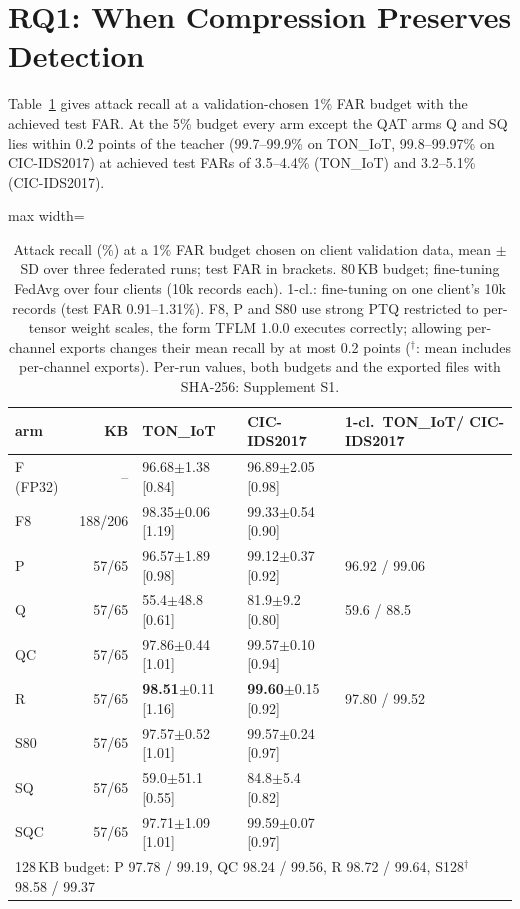 \documentclass[sigplan,10pt,review,anonymous,nonacm]{acmart}
\newcommand{\cic}{CIC-IDS2017\xspace}
\newcommand{\ton}{TON\_IoT\xspace}
\begin{document}
\section{RQ1: When Compression Preserves Detection}\label{sec:rq1}
Table~\ref{tab:e1} gives attack recall at a validation-chosen 1\% FAR budget with the achieved test FAR.
At the 5\% budget every arm except the QAT arms Q and SQ lies within 0.2 points of the teacher
(99.7--99.9\% on \ton, 99.8--99.97\% on \cic) at achieved test FARs of 3.5--4.4\% (\ton) and 3.2--5.1\% (\cic).

\begin{table}[t]
\caption{Attack recall (\%) at a 1\% FAR budget chosen on client validation data, mean $\pm$ SD over three
federated runs; test FAR in brackets. 80\,KB budget; fine-tuning FedAvg over four clients (10k records each).
1-cl.: fine-tuning on one client's 10k records (test FAR 0.91--1.31\%). F8, P and S80 use strong PTQ restricted
to per-tensor weight scales, the form TFLM 1.0.0 executes correctly; allowing per-channel exports changes their
mean recall by at most 0.2 points ($^\dagger$: mean includes per-channel exports). Per-run values, both budgets
and the exported files with SHA-256: Supplement S1.}
\label{tab:e1}
\small\setlength{\tabcolsep}{2pt}
\begin{adjustbox}{max width=\columnwidth}
\begin{tabular}{lrlll}
\toprule
arm & KB & \ton & \cic & 1-cl.\ \ton / \cic \\
\midrule
F (FP32) & -- & 96.68$\pm$1.38 [0.84] & 96.89$\pm$2.05 [0.98] & \\
F8 & 188/206 & 98.35$\pm$0.06 [1.19] & 99.33$\pm$0.54 [0.90] & \\
P & 57/65 & 96.57$\pm$1.89 [0.98] & 99.12$\pm$0.37 [0.92] & 96.92 / 99.06 \\
Q & 57/65 & 55.4$\pm$48.8 [0.61] & 81.9$\pm$9.2 [0.80] & 59.6 / 88.5 \\
QC & 57/65 & 97.86$\pm$0.44 [1.01] & 99.57$\pm$0.10 [0.94] & \\
R & 57/65 & \textbf{98.51}$\pm$0.11 [1.16] & \textbf{99.60}$\pm$0.15 [0.92] & 97.80 / 99.52 \\
S80 & 57/65 & 97.57$\pm$0.52 [1.01] & 99.57$\pm$0.24 [0.97] & \\
SQ & 57/65 & 59.0$\pm$51.1 [0.55] & 84.8$\pm$5.4 [0.82] & \\
SQC & 57/65 & 97.71$\pm$1.09 [1.01] & 99.59$\pm$0.07 [0.97] & \\
\midrule
\multicolumn{5}{l}{128\,KB budget: P 97.78 / 99.19, QC 98.24 / 99.56, R 98.72 / 99.64, S128$^\dagger$ 98.58 / 99.37} \\
\bottomrule
\end{tabular}
\end{adjustbox}
\end{table}
\end{document}
